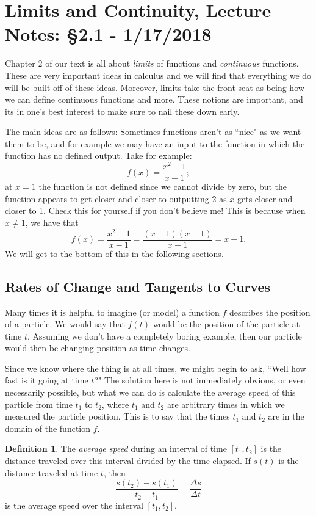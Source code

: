 \documentclass[leqno]{article}
\theoremstyle{definition}
\newtheorem{definition}{Definition}[section]
\theoremstyle{remark}
\theoremstyle{theorem}
\begin{document}
\pagebreak


\section{Limits and Continuity, Lecture Notes: \S 2.1 - 1/17/2018}

Chapter 2 of our text is all about \emph{limits} of functions and \emph{continuous} functions. These are very important ideas in calculus and we will find that everything we do will be built off of these ideas.  Moreover, limits take the front seat as being how we can define continuous functions and more.  These notions are important, and its in one's best interest to make sure to nail these down early.

The main ideas are as follows: Sometimes functions aren't as ``nice" as we want them to be, and for example we may have an input to the function in which the function has no defined output. Take for example:
\[
f(x)=\frac{x^2-1}{x-1};
\]
at $x=1$ the function is not defined since we cannot divide by zero, but the function appears to get closer and closer to outputting 2 as $x$ gets closer and closer to 1. Check this for yourself if you don't believe me! This is because when $x\neq 1$, we have that
\[
f(x)=\frac{x^2-1}{x-1}=\frac{(x-1)(x+1)}{x-1}=x+1.
\]
We will get to the bottom of this in the following sections.

\subsection{Rates of Change and Tangents to Curves}

Many times it is helpful to imagine (or model) a function $f$ describes the position of a particle.  We would say that $f(t)$ would be the position of the particle at time $t$.  Assuming we don't have a completely boring example, then our particle would then be changing position as time changes.  

Since we know where the thing is at all times, we might begin to ask, ``Well how fast is it going at time $t$?" The solution here is not immediately obvious, or even necessarily possible, but what we can do is calculate the average speed of this particle from time $t_1$ to $t_2$, where $t_1$ and $t_2$ are arbitrary times in which we measured the particle position. This is to say that the times $t_1$ and $t_2$ are in the domain of the function $f$. 

\begin{definition}
The \emph{average speed} during an interval of time $[t_1,t_2]$ is the distance traveled over this interval divided by the time elapsed. If $s(t)$ is the distance traveled at time $t$, then 
\[
\frac{s(t_2)-s(t_1)}{t_2-t_1}=\frac{\Delta s}{\Delta t}
\]
is the average speed over the interval $[t_1,t_2]$.
\end{definition}
\end{document}
